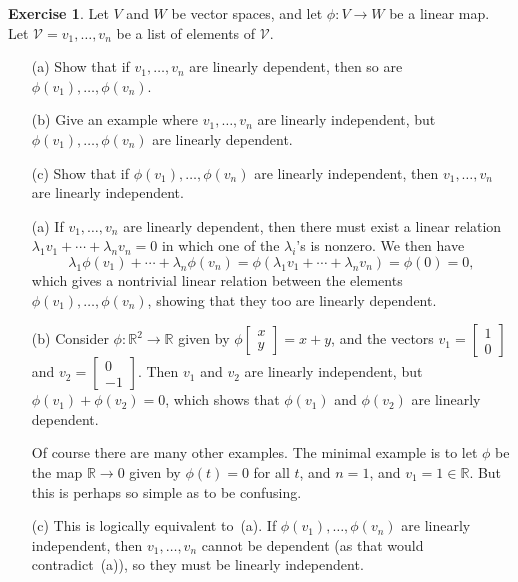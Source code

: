 \documentclass{amsart}
\newcommand{\R}         {{\mathbb{R}}}
\newcommand{\bsm}       {\left[\begin{smallmatrix}}
\newcommand{\esm}       {\end{smallmatrix}\right]}
\newcommand{\lm}        {\lambda}
\newcommand{\xra}       {\xrightarrow}
\newcommand{\CV}        {{\mathcal{V}}}
\renewcommand{\:}       {\colon}
\theoremstyle{definition}
\newtheorem{exercise}{Exercise}[section]
\renewenvironment{solution}{\SolutionAtEnd}{\endSolutionAtEnd}
\begin{document}
\begin{exercise}
 Let $V$ and $W$ be vector spaces, and let $\phi\:V\to W$ be
 a linear map.  Let $\CV=v_1,\dotsc,v_n$ be a list of
 elements of $\CV$. 
 \begin{itemize}
  \item[(a)] Show that if $v_1,\dotsc,v_n$ are linearly
   dependent, then so are $\phi(v_1),\dotsc,\phi(v_n)$. 
  \item[(b)] Give an example where $v_1,\dotsc,v_n$ are
   linearly independent, but $\phi(v_1),\dotsc,\phi(v_n)$
   are linearly dependent. 
  \item[(c)] Show that if $\phi(v_1),\dotsc,\phi(v_n)$ are
   linearly independent, then $v_1,\dotsc,v_n$ are linearly
   independent. 
 \end{itemize}
\end{exercise}
\begin{solution}
 \begin{itemize}
  \item[(a)] If $v_1,\dotsc,v_n$ are linearly dependent,
   then there must exist a linear relation
   $\lm_1v_1+\dotsb+\lm_nv_n=0$ in which one of the
   $\lm_i$'s is nonzero.  We then have
   \[ \lm_1\phi(v_1)+\dotsb+\lm_n\phi(v_n) = 
      \phi(\lm_1v_1+\dotsb+\lm_nv_n) = \phi(0) = 0,
   \]
   which gives a nontrivial linear relation between the
   elements $\phi(v_1),\dotsc,\phi(v_n)$, showing that they
   too are linearly dependent. 
  \item[(b)] Consider $\phi\:\R^2\to\R$ given by
   $\phi\bsm x\\ y\esm=x+y$, and the vectors
   $v_1=\bsm 1\\0\esm$ and $v_2=\bsm 0\\-1\esm$.  Then $v_1$
   and $v_2$ are linearly independent, but
   $\phi(v_1)+\phi(v_2)=0$, which shows that $\phi(v_1)$ and
   $\phi(v_2)$ are linearly dependent.  

   Of course there are many other examples.  The minimal
   example is to let $\phi$ be the map $\R\xra{}0$ given by
   $\phi(t)=0$ for all $t$, and $n=1$, and $v_1=1\in\R$. 
   But this is perhaps so simple as to be confusing. 
  \item[(c)] This is logically equivalent to~(a).  If
   $\phi(v_1),\dotsc,\phi(v_n)$ are linearly independent,
   then $v_1,\dotsc,v_n$ cannot be dependent (as that would
   contradict~(a)), so they must be linearly independent. 
 \end{itemize}
\end{solution}
\end{document}
